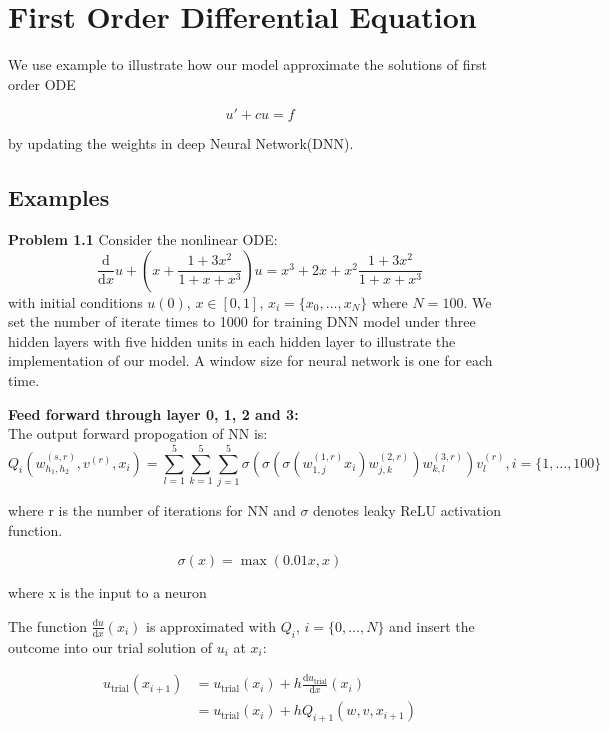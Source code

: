 \documentclass{article}
\begin{document}
	\section{First Order Differential Equation}
	We use example to illustrate how our model approximate the solutions of first order ODE 
	
	\[u' + cu =f\]
	
	by updating the weights in deep Neural Network(DNN).
		\subsection{Examples}
	
		\textbf{Problem 1.1} Consider the nonlinear ODE: 
	\[\frac{\mathrm{d}}{\mathrm{d}x}u + \left(x+\frac{1+3x^2}{1+x+x^3}\right)u = x^3 +2x +x^{2}\frac{1+3x^2}{1+x+x^3}\]
	with initial conditions $u(0)$, $x \in [0,1]$, $x_i=\{x_0, \dots, x_N\}$ where $N=100$. We set the number of iterate times to 1000 for training DNN model under three hidden layers with five hidden units in each hidden layer to illustrate the implementation of our model. A window size for neural network is one for each time. 
	
	\medspace \noindent
	\textbf{Feed forward through layer 0, 1, 2 and 3:}\\
	
	The output forward propogation of NN is:
	\begin{equation}\label{eq:output_ode}
	Q_i (w_{h_{1},h_{2}}^{(s,r)} ,v^{(r)},x_i)=  \sum_{\textit{l}=1}^{5} \sum_{k=1}^{5} \sum_{j=1}^{5} \sigma ( \sigma ( \sigma (w_{1,j}^{(1,r)}x_i)w_{j,k}^{(2,r)})w_{k,\textit{l}}^{(3,r)})v_{\textit{l}}^{(r)}, i = \{1, \dots, 100\}
	\end{equation}
	
		\medspace \noindent
	where r is the number of iterations for NN and $\sigma$ denotes leaky ReLU activation function.
	
	\[\sigma(x) = \max (0.01x,x)\]
	
	\medspace \noindent
	where x is the input to a neuron
	
	 The function $\frac{\mathrm{d}u}{\mathrm{d}x}(x_i)$ is approximated with $Q_i$, $i=\{0, \dots, N\}$ and insert the outcome into our trial solution of $u_i$ at $x_i$:  
	
	\begin{equation}
	\begin{aligned}
	u_{\text{trial}}(x_{i+1}) &= u_{\text{trial}}(x_{i}) +h\frac{\mathrm{d}u_{\text{trial}}}{\mathrm{d}x}(x_i) \\
							  &=  u_{\text{trial}}(x_{i}) +hQ_{i+1}(w,v,x_{i+1})
	\end{aligned}
	\label{eq:trial_example1}
	\end{equation}
	
\end{document}
